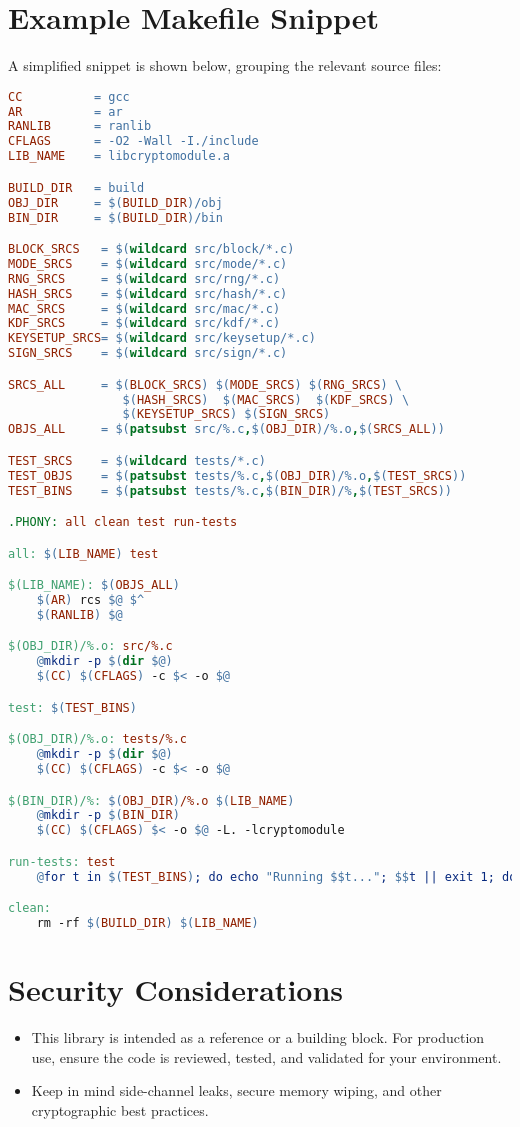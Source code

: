 \documentclass[12pt,a4paper]{article}
\begin{document}
\section{Example Makefile Snippet}
\label{sec:makefile-snippet}

A simplified snippet is shown below, grouping the relevant source files:

\begin{lstlisting}[language=make,caption={Sample Makefile Snippet}]
CC          = gcc
AR          = ar
RANLIB      = ranlib
CFLAGS      = -O2 -Wall -I./include
LIB_NAME    = libcryptomodule.a

BUILD_DIR   = build
OBJ_DIR     = $(BUILD_DIR)/obj
BIN_DIR     = $(BUILD_DIR)/bin

BLOCK_SRCS   = $(wildcard src/block/*.c)
MODE_SRCS    = $(wildcard src/mode/*.c)
RNG_SRCS     = $(wildcard src/rng/*.c)
HASH_SRCS    = $(wildcard src/hash/*.c)
MAC_SRCS     = $(wildcard src/mac/*.c)
KDF_SRCS     = $(wildcard src/kdf/*.c)
KEYSETUP_SRCS= $(wildcard src/keysetup/*.c)
SIGN_SRCS    = $(wildcard src/sign/*.c)

SRCS_ALL     = $(BLOCK_SRCS) $(MODE_SRCS) $(RNG_SRCS) \
                $(HASH_SRCS)  $(MAC_SRCS)  $(KDF_SRCS) \
                $(KEYSETUP_SRCS) $(SIGN_SRCS)
OBJS_ALL     = $(patsubst src/%.c,$(OBJ_DIR)/%.o,$(SRCS_ALL))

TEST_SRCS    = $(wildcard tests/*.c)
TEST_OBJS    = $(patsubst tests/%.c,$(OBJ_DIR)/%.o,$(TEST_SRCS))
TEST_BINS    = $(patsubst tests/%.c,$(BIN_DIR)/%,$(TEST_SRCS))

.PHONY: all clean test run-tests

all: $(LIB_NAME) test

$(LIB_NAME): $(OBJS_ALL)
    $(AR) rcs $@ $^
    $(RANLIB) $@

$(OBJ_DIR)/%.o: src/%.c
    @mkdir -p $(dir $@)
    $(CC) $(CFLAGS) -c $< -o $@

test: $(TEST_BINS)

$(OBJ_DIR)/%.o: tests/%.c
    @mkdir -p $(dir $@)
    $(CC) $(CFLAGS) -c $< -o $@

$(BIN_DIR)/%: $(OBJ_DIR)/%.o $(LIB_NAME)
    @mkdir -p $(BIN_DIR)
    $(CC) $(CFLAGS) $< -o $@ -L. -lcryptomodule

run-tests: test
    @for t in $(TEST_BINS); do echo "Running $$t..."; $$t || exit 1; done

clean:
    rm -rf $(BUILD_DIR) $(LIB_NAME)
\end{lstlisting}

\section{Security Considerations}
\label{sec:security}
\begin{itemize}
    \item This library is intended as a reference or a building block. For production use, ensure the code is reviewed, tested, and validated for your environment.
    \item Keep in mind side-channel leaks, secure memory wiping, and other cryptographic best practices.
\end{itemize}
\end{document}
